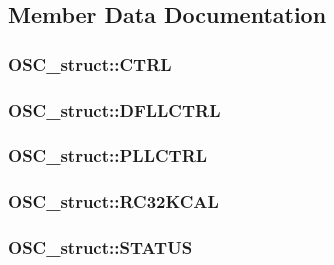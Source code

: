 \subsection{Member Data Documentation}
\hypertarget{struct_o_s_c__struct_abb55d14e49bb9b0d6e67d5a629f33469}{
\subsubsection[{CTRL}]{ {\bf OSC\_\-struct::CTRL}}}
\label{struct_o_s_c__struct_abb55d14e49bb9b0d6e67d5a629f33469}
\hypertarget{struct_o_s_c__struct_aacaa3061d2c95ae3a4492a48c8d337cf}{
\subsubsection[{DFLLCTRL}]{ {\bf OSC\_\-struct::DFLLCTRL}}}
\label{struct_o_s_c__struct_aacaa3061d2c95ae3a4492a48c8d337cf}
\hypertarget{struct_o_s_c__struct_ae66937d447af0de1d98a82b521c2dd80}{
\subsubsection[{PLLCTRL}]{ {\bf OSC\_\-struct::PLLCTRL}}}
\label{struct_o_s_c__struct_ae66937d447af0de1d98a82b521c2dd80}
\hypertarget{struct_o_s_c__struct_a82e04fbafe8bb39238c2f90323bcdae4}{
\subsubsection[{RC32KCAL}]{ {\bf OSC\_\-struct::RC32KCAL}}}
\label{struct_o_s_c__struct_a82e04fbafe8bb39238c2f90323bcdae4}
\hypertarget{struct_o_s_c__struct_a58fa3d26755565f35125d6b8c190b1c4}{
\subsubsection[{STATUS}]{ {\bf OSC\_\-struct::STATUS}}}
